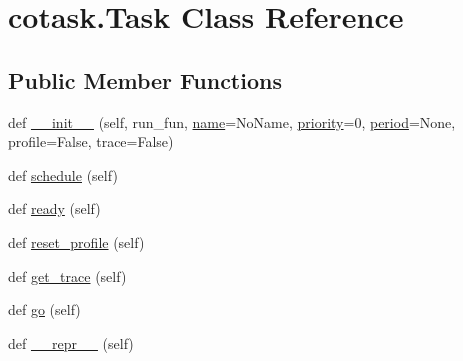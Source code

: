 \hypertarget{classcotask_1_1Task}{}\section{cotask.\+Task Class Reference}
\label{classcotask_1_1Task}
\subsection*{Public Member Functions}
\begin{DoxyCompactItemize}
\item 
def \mbox{\hyperlink{classcotask_1_1Task_a20a30d252e750706e77553a6244ae457}{\+\_\+\+\_\+init\+\_\+\+\_\+}} (self, run\+\_\+fun, \mbox{\hyperlink{classcotask_1_1Task_ab54e069dd0b4f0a2f8e7f00c94998a10}{name}}=\textquotesingle{}No\+Name\textquotesingle{}, \mbox{\hyperlink{classcotask_1_1Task_aeced93c7b7d23e33de9693d278aef88b}{priority}}=0, \mbox{\hyperlink{classcotask_1_1Task_a44f980f61f1908764c6821fa886590ca}{period}}=None, profile=False, trace=False)
\item 
def \mbox{\hyperlink{classcotask_1_1Task_a7c5bee1f632d4f71fd5ca02852b430a5}{schedule}} (self)
\item 
def \mbox{\hyperlink{classcotask_1_1Task_af9c086f64b9d3e3bb209d582dcc431a4}{ready}} (self)
\item 
def \mbox{\hyperlink{classcotask_1_1Task_a1bcbfa7dd7086112af20b7247ffa4a2e}{reset\+\_\+profile}} (self)
\item 
def \mbox{\hyperlink{classcotask_1_1Task_a6e51a228f985aec8c752bd72a73730ae}{get\+\_\+trace}} (self)
\item 
def \mbox{\hyperlink{classcotask_1_1Task_a78e74d18a5ba94074c2b5309394409a5}{go}} (self)
\item 
def \mbox{\hyperlink{classcotask_1_1Task_a2dcb50b9bf2676dfaac176649bc7d3f9}{\+\_\+\+\_\+repr\+\_\+\+\_\+}} (self)
\end{DoxyCompactItemize}
